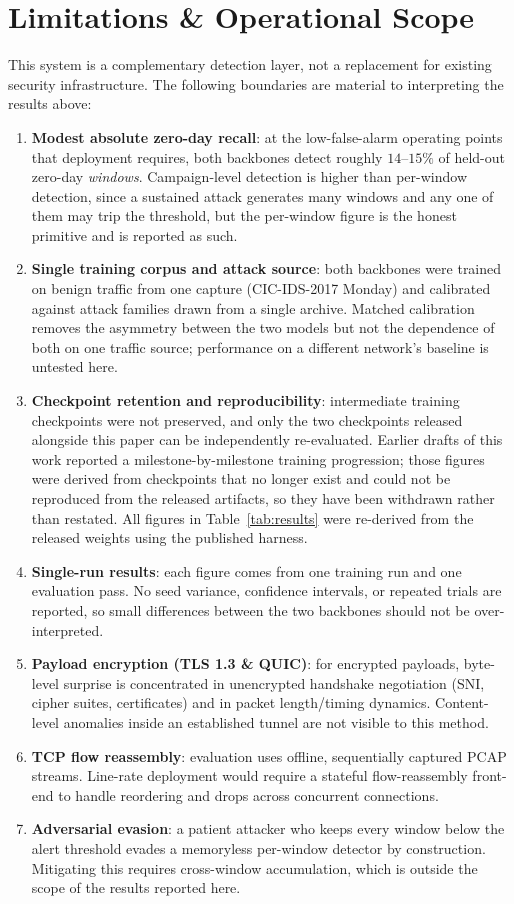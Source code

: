 \documentclass[10pt,journal,compsoc]{IEEEtran}
\begin{document}
\section{Limitations \& Operational Scope}
\label{sec:limits}
This system is a complementary detection layer, not a replacement for existing security infrastructure. The following boundaries are material to interpreting the results above:
\begin{enumerate}
    \item \textbf{Modest absolute zero-day recall}: at the low-false-alarm operating points that deployment requires, both backbones detect roughly $14$--$15\%$ of held-out zero-day \emph{windows}. Campaign-level detection is higher than per-window detection, since a sustained attack generates many windows and any one of them may trip the threshold, but the per-window figure is the honest primitive and is reported as such.
    \item \textbf{Single training corpus and attack source}: both backbones were trained on benign traffic from one capture (CIC-IDS-2017 Monday) and calibrated against attack families drawn from a single archive. Matched calibration removes the asymmetry between the two models but not the dependence of both on one traffic source; performance on a different network's baseline is untested here.
    \item \textbf{Checkpoint retention and reproducibility}: intermediate training checkpoints were not preserved, and only the two checkpoints released alongside this paper can be independently re-evaluated. Earlier drafts of this work reported a milestone-by-milestone training progression; those figures were derived from checkpoints that no longer exist and could not be reproduced from the released artifacts, so they have been withdrawn rather than restated. All figures in Table~\ref{tab:results} were re-derived from the released weights using the published harness.
    \item \textbf{Single-run results}: each figure comes from one training run and one evaluation pass. No seed variance, confidence intervals, or repeated trials are reported, so small differences between the two backbones should not be over-interpreted.
    \item \textbf{Payload encryption (TLS 1.3 \& QUIC)}: for encrypted payloads, byte-level surprise is concentrated in unencrypted handshake negotiation (SNI, cipher suites, certificates) and in packet length/timing dynamics. Content-level anomalies inside an established tunnel are not visible to this method.
    \item \textbf{TCP flow reassembly}: evaluation uses offline, sequentially captured PCAP streams. Line-rate deployment would require a stateful flow-reassembly front-end to handle reordering and drops across concurrent connections.
    \item \textbf{Adversarial evasion}: a patient attacker who keeps every window below the alert threshold evades a memoryless per-window detector by construction. Mitigating this requires cross-window accumulation, which is outside the scope of the results reported here.
\end{enumerate}
\end{document}
